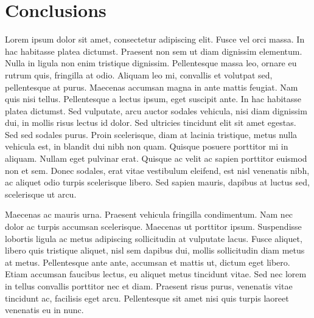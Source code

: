 \documentclass[botnum,fleqn,final]{unmeethesis}
\begin{document}
\chapter{\label{chapter:conc}Conclusions}

Lorem ipsum dolor sit amet, consectetur adipiscing elit. Fusce vel orci massa.
In hac habitasse platea dictumst. Praesent non sem ut diam dignissim elementum.
Nulla in ligula non enim tristique dignissim. Pellentesque massa leo, ornare eu
rutrum quis, fringilla at odio. Aliquam leo mi, convallis et volutpat sed,
pellentesque at purus. Maecenas accumsan magna in ante mattis feugiat. Nam quis
nisi tellus. Pellentesque a lectus ipsum, eget suscipit ante. In hac habitasse
platea dictumst. Sed vulputate, arcu auctor sodales vehicula, nisi diam
dignissim dui, in mollis risus lectus id dolor. Sed ultricies tincidunt elit
sit amet egestas. Sed sed sodales purus. Proin scelerisque, diam at lacinia
tristique, metus nulla vehicula est, in blandit dui nibh non quam. Quisque
posuere porttitor mi in aliquam. Nullam eget pulvinar erat. Quisque ac velit ac
sapien porttitor euismod non et sem. Donec sodales, erat vitae vestibulum
eleifend, est nisl venenatis nibh, ac aliquet odio turpis scelerisque libero.
Sed sapien mauris, dapibus at luctus sed, scelerisque ut arcu.

Maecenas ac mauris urna. Praesent vehicula fringilla condimentum. Nam nec dolor
ac turpis accumsan scelerisque. Maecenas ut porttitor ipsum. Suspendisse
lobortis ligula ac metus adipiscing sollicitudin at vulputate lacus. Fusce
aliquet, libero quis tristique aliquet, nisl sem dapibus dui, mollis
sollicitudin diam metus at metus. Pellentesque ante ante, accumsan et mattis
ut, dictum eget libero. Etiam accumsan faucibus lectus, eu aliquet metus
tincidunt vitae. Sed nec lorem in tellus convallis porttitor nec et diam.
Praesent risus purus, venenatis vitae tincidunt ac, facilisis eget arcu.
Pellentesque sit amet nisi quis turpis laoreet venenatis eu in nunc.
\end{document}
